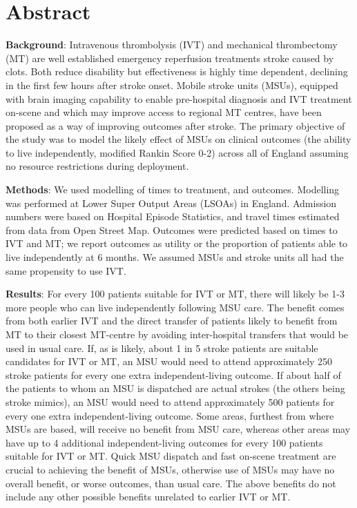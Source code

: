 \section*{Abstract}

\textbf{Background}: Intravenous thrombolysis (IVT) and mechanical thrombectomy (MT) are well established emergency reperfusion treatments stroke caused by clots. Both reduce disability but effectiveness is  highly time dependent, declining in the first few hours after stroke onset. Mobile stroke units (MSUs), equipped with brain imaging capability to enable pre-hospital diagnosis and IVT treatment on-scene and which may improve access to regional MT centres, have been proposed as a way of improving outcomes after stroke. The primary objective of the study was to model the likely effect of MSUs on clinical outcomes (the ability to live independently, modified Rankin Score 0-2) across all of England assuming no resource restrictions during deployment. 

\textbf{Methods}: We used modelling of times to treatment, and outcomes. Modelling was performed at Lower Super Output Areas (LSOAs) in England. Admission numbers were based on Hospital Episode Statistics, and travel times estimated from data from Open Street Map. Outcomes were predicted based on times to IVT and MT; we report outcomes as utility or the proportion of patients able to live independently at 6 months. We assumed MSUs and stroke units all had the same propensity to use IVT.

\textbf{Results}: For every 100 patients suitable for IVT or MT, there will likely be 1-3 more people who can live independently following MSU care. The benefit comes from both earlier IVT and the direct transfer of patients likely to benefit from MT to their closest MT-centre by avoiding inter-hospital transfers that would be used in usual care. If, as is likely, about 1 in 5 stroke patients are suitable candidates for IVT or MT, an MSU would need to attend approximately 250 stroke patients for every one extra independent-living outcome. If about half of the patients to whom an MSU is dispatched are actual strokes (the others being stroke mimics), an MSU would need to attend approximately 500 patients for every one extra independent-living outcome. Some areas, furthest from where MSUs are based, will receive no benefit from MSU care, whereas other areas may have up to 4 additional independent-living outcomes for every 100 patients suitable for IVT or MT. Quick MSU dispatch and fast on-scene treatment are crucial to achieving the benefit of MSUs, otherwise use of MSUs may have no overall benefit, or worse outcomes, than usual care. The above benefits do not include any other possible benefits unrelated to earlier IVT or MT.

